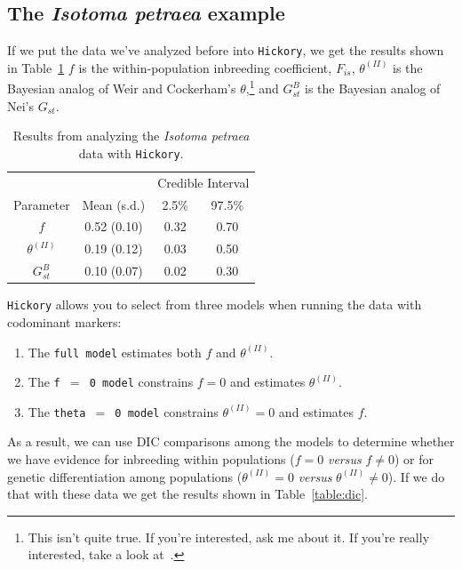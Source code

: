 \subsection*{The {\it Isotoma petraea} example}

If we put the data we've analyzed before into {\tt Hickory}, we get
the results shown in Table~\ref{table:james} $f$ is the
within-population inbreeding coefficient, $F_{is}$, $\theta^{(II)}$ is
the Bayesian analog of Weir and Cockerham's $\theta$,\footnote{This
  isn't quite true. If you're interested, ask me about it. If you're
  really interested, take a look at~\cite{Song-etal-2006}.}  and
$G_{st}^B$ is the Bayesian analog of Nei's $G_{st}$.

\begin{table}
\begin{center}
\begin{tabular}{cccc}
\hline\hline
           &             & \multicolumn{2}{c}{Credible Interval} \\
Parameter  & Mean (s.d.)     & 2.5\% & 97.5\% \\
\hline
$f$            & 0.52 (0.10) & 0.32 & 0.70 \\
$\theta^{(II)}$ & 0.19 (0.12) & 0.03 & 0.50 \\
$G_{st}^B$      & 0.10 (0.07) & 0.02 & 0.30 \\
\hline
\end{tabular}
\caption{Results from analyzing the {\it Isotoma petraea} data with
  {\tt Hickory}.}\label{table:james}
\end{center}
\end{table}

{\tt Hickory} allows you to select from three models when running the
data with codominant markers:

\begin{enumerate}

\item The {\tt full model} estimates both $f$ and $\theta^{(II)}$.

\item The {\tt f $=$ 0 model} constrains $f=0$ and estimates
  $\theta^{(II)}$. 

\item The {\tt theta $=$ 0 model} constrains $\theta^{(II)} = 0$ and
  estimates $f$.

\end{enumerate}

As a result, we can use DIC comparisons among the models to determine
whether we have evidence for inbreeding within populations ($f=0$ {\it
  versus} $f \ne 0$) or for genetic differentiation among populations
($\theta^{(II)}=0$ {\it versus} $\theta^{(II)} \ne 0$). If we do that with these
data we get the results shown in Table~\ref{table:dic}.

